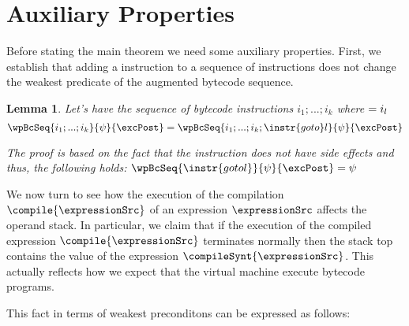 

\newtheorem{interProp}{Lemma} %

\newtheorem{exprValueOnStack}[interProp]{Lemma}
\newtheorem{stackCounter}[interProp]{Lemma}
\newtheorem{dupProp}[interProp]{Lemma}
\newtheorem{newProp}[interProp]{Lemma}


\section{Auxiliary Properties}

Before stating the main theorem we need some auxiliary properties.
 First, we establish that adding a  instruction  to a sequence of instructions does not change the weakest predicate of the
 augmented bytecode sequence.  


\begin{interProp} \label{interProp}
Let's have the sequence of bytecode instructions $i_1;...;i_k$ where $ \next{i_k} = i_l$
     $$ \wpBcSeq{ i_1;...;i_k}{ \psi  }  { \excPost } = 
\wpBcSeq{i_1;...;i_k; \instr{goto} l }{\psi }{\excPost} $$

The proof is based on the fact that the instruction  does not have side effects and thus,
the following holds: $ \wpBcSeq{ \instr{goto l}}{\psi}{\excPost} = \psi $
\end{interProp}


We now turn to see how the execution of the compilation  $\compile{\expressionSrc}$ of an expression 
$\expressionSrc$ affects the operand stack. In particular, we claim that if the execution of the compiled expression 
 $\compile{\expressionSrc}$ terminates normally then the stack top contains the value of the expression $\compileSynt{\expressionSrc}$.
This actually reflects how we expect that the virtual machine execute bytecode programs.

 This fact in terms of weakest 
preconditons can be expressed as follows: 

